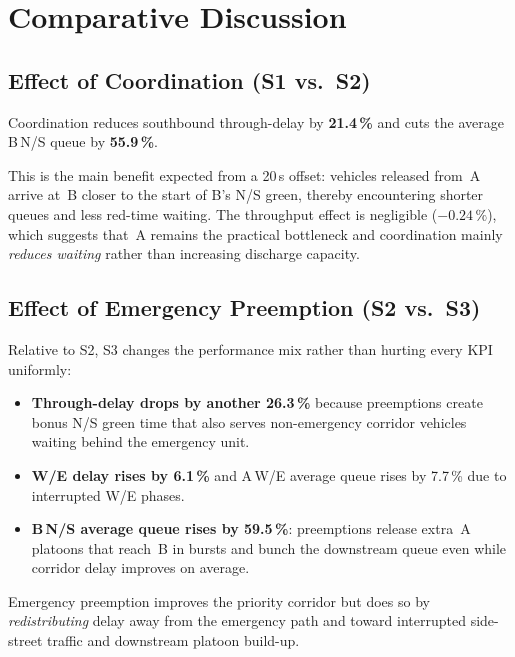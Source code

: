 \documentclass[11pt,a4paper]{article}
\begin{document}
\section{Comparative Discussion}
\label{sec:discussion}

\subsection{Effect of Coordination (S1 vs.\ S2)}

\begin{findingbox}
Coordination reduces southbound through-delay by \textbf{21.4\,\%} and cuts the average B\,N/S queue by \textbf{55.9\,\%}.
\end{findingbox}

This is the main benefit expected from a 20\,s offset: vehicles released from~A arrive at~B closer to the start of B's N/S green, thereby encountering shorter queues and less red-time waiting. The throughput effect is negligible ($-0.24\,\%$), which suggests that~A remains the practical bottleneck and coordination mainly \emph{reduces waiting} rather than increasing discharge capacity.

\subsection{Effect of Emergency Preemption (S2 vs.\ S3)}

Relative to S2, S3 changes the performance mix rather than hurting every KPI uniformly:

\begin{itemize}[leftmargin=1.2em,itemsep=3pt]
  \item \textbf{Through-delay drops by another 26.3\,\%} because preemptions create bonus N/S green time that also serves non-emergency corridor vehicles waiting behind the emergency unit.
  \item \textbf{W/E delay rises by 6.1\,\%} and A\,W/E average queue rises by 7.7\,\% due to interrupted W/E phases.
  \item \textbf{B\,N/S average queue rises by 59.5\,\%}: preemptions release extra~A platoons that reach~B in bursts and bunch the downstream queue even while corridor delay improves on average.
\end{itemize}

\begin{cautionbox}
Emergency preemption improves the priority corridor but does so by \emph{redistributing} delay away from the emergency path and toward interrupted side-street traffic and downstream platoon build-up.
\end{cautionbox}
\end{document}
